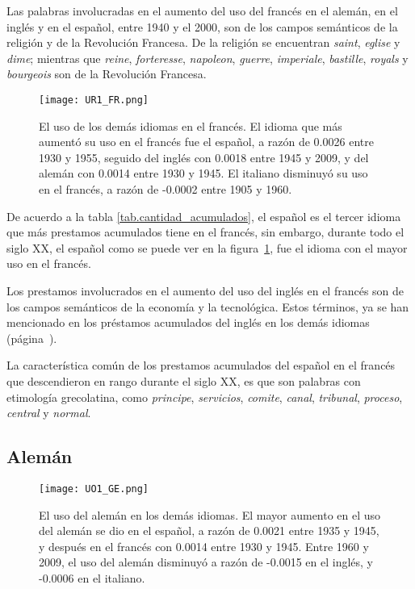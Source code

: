 Las palabras involucradas en el aumento del uso del francés en el alemán, en el inglés y en el español, entre 1940 y el 2000, son de los campos semánticos de la religión y de la Revolución Francesa. De la religión se encuentran \textit{saint}, \textit{eglise} y \textit{dime}; mientras que \textit{reine}, \textit{forteresse}, \textit{napoleon}, \textit{guerre}, \textit{imperiale}, \textit{bastille}, \textit{royals} y \textit{bourgeois} son de la Revolución Francesa. 
\label{FR-D}


\begin{figure}[h!]
	\centering
	\texttt{[image: UR1\_FR.png]}
	\caption{El uso de los demás idiomas en el francés. El idioma que más aumentó su uso en el francés fue el español, a razón de  0.0026  entre 1930 y 1955, seguido del inglés con 0.0018 entre 1945 y 2009, y del alemán con 0.0014 entre 1930 y 1945. El italiano  disminuyó su uso en el francés, a razón de -0.0002 entre 1905 y 1960.}
	\label{fig.UR_FR}
\end{figure}
		
De acuerdo a la tabla \ref{tab.cantidad_acumulados},  el español es el tercer idioma que más prestamos acumulados tiene en el francés, sin embargo, durante todo el siglo XX, el español como se puede ver en la figura~\ref{fig.UR_FR}, fue el idioma con el mayor uso en el francés.

Los prestamos involucrados en el aumento del uso del inglés en el francés son de los campos semánticos de la economía y la tecnológica. Estos términos, ya se han mencionado en los préstamos acumulados del inglés en los demás idiomas (página~\pageref{EN-D}).
	
La característica común de los prestamos acumulados del español en el francés que descendieron en rango durante el siglo XX, es que son palabras con etimología grecolatina,  como \textit{principe}, \textit{servicios}, \textit{comite}, \textit{canal}, \textit{tribunal}, \textit{proceso}, \textit{central} y \textit{normal}. 
\label{D-FR}



\subsection{Alemán} %

\begin{figure}[h!]
	\centering
	\texttt{[image: UO1\_GE.png]}
	\caption{El uso del alemán en los demás idiomas. El mayor aumento en el uso del alemán se dio en el español, a razón de 0.0021  entre 1935 y 1945, y después en el francés con 0.0014 entre 1930 y 1945.  Entre 1960 y 2009, el uso del alemán disminuyó  a razón de -0.0015 en el inglés, y -0.0006 en el italiano.}
	\label{fig.UO_GE}

\end{figure}

